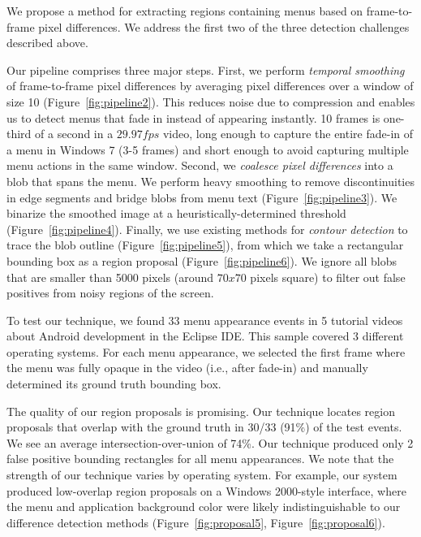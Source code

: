 \documentclass[10pt]{article}
\begin{document}
We propose a method for extracting regions containing menus based on frame-to-frame pixel
differences.  We address the first two of the three detection challenges described above.

Our pipeline comprises three major steps.  First, we perform \emph{temporal smoothing}
of frame-to-frame pixel differences by averaging pixel differences over a window of size 10 
(Figure~\ref{fig:pipeline2}).  This reduces noise due to compression and enables us to detect
menus that fade in instead of appearing instantly.  10 frames is one-third of a second in a $29.97fps$ video, 
long enough to capture the entire fade-in of a menu in Windows 7 (3-5 frames)
and short enough to avoid capturing multiple menu actions in the same window.  Second, we \emph{coalesce
pixel differences} into a blob that spans the menu.  We perform heavy smoothing to remove
discontinuities in edge segments and bridge blobs from menu text (Figure~\ref{fig:pipeline3}).
We binarize the smoothed image at a heuristically-determined threshold (Figure~\ref{fig:pipeline4}).
Finally, we use existing methods for \emph{contour detection} to trace the blob outline (Figure~\ref{fig:pipeline5}),
from which we take a rectangular bounding box as a region proposal (Figure~\ref{fig:pipeline6}).
We ignore all blobs that are smaller than 5000 pixels (around $70x70$ pixels square) to filter
out false positives from noisy regions of the screen.

To test our technique, we found 33 menu appearance events in 5 tutorial videos about Android development
in the Eclipse IDE.  This sample covered 3 different operating systems.
For each menu appearance, we selected the first frame where the menu was fully opaque in the video
(i.e., after fade-in) and manually determined its ground truth bounding box.

The quality of our region proposals is promising.  Our technique locates region proposals that
overlap with the ground truth in 30/33 (91\%) of the test events.  We see an average 
intersection-over-union of 74\%.  Our technique produced only 2 false positive bounding rectangles 
for all menu appearances.  We note that the strength of our technique varies by
operating system.  For example, our system produced low-overlap region proposals
on a Windows 2000-style interface, where the menu and application background color were likely
indistinguishable to our difference detection methods (Figure~\ref{fig:proposal5}, Figure~\ref{fig:proposal6}).
\end{document}
